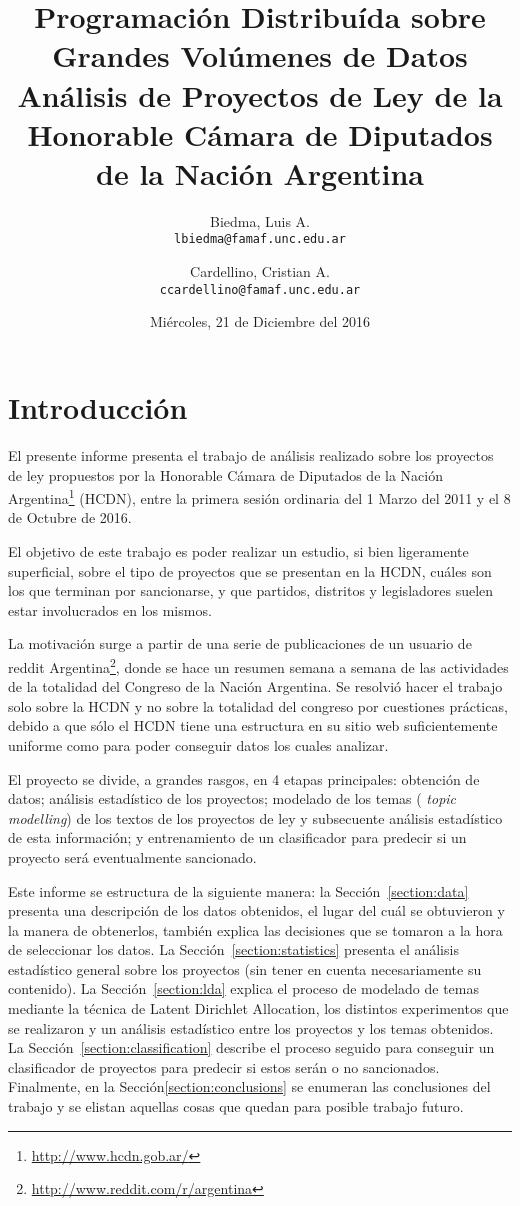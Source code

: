 \documentclass[12pt,a4paper,titlepage]{article}
\title{
  \large{Programación Distribuída sobre Grandes Volúmenes de Datos}\\
  \Large{Análisis de Proyectos de Ley de la Honorable Cámara de Diputados de la Nación Argentina}
}
\author{Biedma, Luis A.\\         \texttt{lbiedma@famaf.unc.edu.ar}
        \and
        Cardellino, Cristian A.\\ \texttt{ccardellino@famaf.unc.edu.ar}}
\date{Miércoles, 21 de Diciembre del 2016}
\begin{document}
  \maketitle

  \section{Introducción}\label{section:introduction}

  El presente informe presenta el trabajo de análisis realizado sobre los
  proyectos de ley propuestos por la Honorable Cámara de Diputados de la Nación
  Argentina\footnote{\url{http://www.hcdn.gob.ar/}} (HCDN), entre la primera
  sesión ordinaria del 1 Marzo del 2011 y el 8 de Octubre de 2016.

  El objetivo de este trabajo es poder realizar un estudio, si bien ligeramente
  superficial, sobre el tipo de proyectos que se presentan en la HCDN, cuáles
  son los que terminan por sancionarse, y que partidos, distritos y
  legisladores suelen estar involucrados en los mismos.

  La motivación surge a partir de una serie de publicaciones de un usuario de
  reddit Argentina\footnote{\url{http://www.reddit.com/r/argentina}}, donde se
  hace un resumen semana a semana de las actividades de la totalidad del
  Congreso de la Nación Argentina.  Se resolvió hacer el trabajo solo sobre la
  HCDN y no sobre la totalidad del congreso por cuestiones prácticas, debido a
  que sólo el HCDN tiene una estructura en su sitio web suficientemente
  uniforme como para poder conseguir datos los cuales analizar.

  El proyecto se divide, a grandes rasgos, en 4 etapas principales: obtención
  de datos; análisis estadístico de los proyectos; modelado de los temas ({\em
  topic modelling}) de los textos de los proyectos de ley y subsecuente
  análisis estadístico de esta información; y entrenamiento de un clasificador
  para predecir si un proyecto será eventualmente sancionado.

  Este informe se estructura de la siguiente manera: la
  Sección~\ref{section:data} presenta una descripción de los datos obtenidos,
  el lugar del cuál se obtuvieron y la manera de obtenerlos, también explica
  las decisiones que se tomaron a la hora de seleccionar los datos. La
  Sección~\ref{section:statistics} presenta el análisis estadístico general
  sobre los proyectos (sin tener en cuenta necesariamente su contenido). La
  Sección~\ref{section:lda} explica el proceso de modelado de temas mediante la
  técnica de Latent Dirichlet Allocation, los distintos experimentos que se
  realizaron y un análisis estadístico entre los proyectos y los temas
  obtenidos.
  La Sección~\ref{section:classification} describe el proceso seguido para
  conseguir un clasificador de proyectos para predecir si estos serán o no
  sancionados.
  Finalmente, en la Sección\ref{section:conclusions} se enumeran las
  conclusiones del trabajo y se elistan aquellas cosas que quedan para posible
  trabajo futuro.
\end{document}
